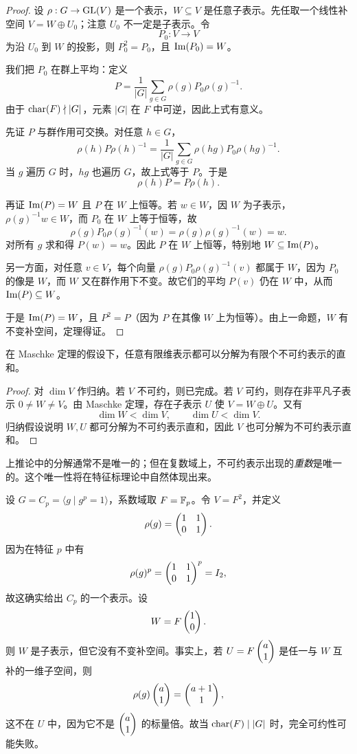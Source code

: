 \begin{proof}
设 $\rho:G\to \mathrm{GL}(V)$ 是一个表示，$W\subseteq V$ 是任意子表示。先任取一个线性补空间 $V=W\oplus U_0$；注意 $U_0$ 不一定是子表示。令
\[
P_0:V\to V
\]
为沿 $U_0$ 到 $W$ 的投影，则 $P_0^2=P_0$，且 $\mathrm{Im}(P_0)=W$。

我们把 $P_0$ 在群上平均：定义
\[
P=\frac{1}{|G|}\sum_{g\in G}\rho(g)P_0\rho(g)^{-1}.
\]
由于 $\mathrm{char}(F)\nmid |G|$，元素 $|G|$ 在 $F$ 中可逆，因此上式有意义。

先证 $P$ 与群作用可交换。对任意 $h\in G$，
\[
\rho(h)P\rho(h)^{-1}
=\frac{1}{|G|}\sum_{g\in G}\rho(hg)P_0\rho(hg)^{-1}.
\]
当 $g$ 遍历 $G$ 时，$hg$ 也遍历 $G$，故上式等于 $P$。于是
\[
\rho(h)P=P\rho(h).
\]

再证 $\mathrm{Im}(P)=W$ 且 $P$ 在 $W$ 上恒等。若 $w\in W$，因 $W$ 为子表示，$\rho(g)^{-1}w\in W$，而 $P_0$ 在 $W$ 上等于恒等，故
\[
\rho(g)P_0\rho(g)^{-1}(w)=\rho(g)\rho(g)^{-1}(w)=w.
\]
对所有 $g$ 求和得 $P(w)=w$。因此 $P$ 在 $W$ 上恒等，特别地 $W\subseteq \mathrm{Im}(P)$。

另一方面，对任意 $v\in V$，每个向量 $\rho(g)P_0\rho(g)^{-1}(v)$ 都属于 $W$，因为 $P_0$ 的像是 $W$，而 $W$ 又在群作用下不变。故它们的平均 $P(v)$ 仍在 $W$ 中，从而 $\mathrm{Im}(P)\subseteq W$。

于是 $\mathrm{Im}(P)=W$，且 $P^2=P$（因为 $P$ 在其像 $W$ 上为恒等）。由上一命题，$W$ 有不变补空间，定理得证。
\end{proof}

\begin{corollary}
在 Maschke 定理的假设下，任意有限维表示都可以分解为有限个不可约表示的直和。
\end{corollary}

\begin{proof}
对 $\dim V$ 作归纳。若 $V$ 不可约，则已完成。若 $V$ 可约，则存在非平凡子表示 $0\neq W\neq V$。由 Maschke 定理，存在子表示 $U$ 使 $V=W\oplus U$。又有
\[
\dim W<\dim V,\qquad \dim U<\dim V.
\]
归纳假设说明 $W,U$ 都可分解为不可约表示直和，因此 $V$ 也可分解为不可约表示直和。
\end{proof}

\begin{remark}
上推论中的分解通常不是唯一的；但在复数域上，不可约表示出现的\emph{重数}是唯一的。这个唯一性将在特征标理论中自然体现出来。
\end{remark}

\begin{example}
设 $G=C_p=\langle g\mid g^p=1\rangle$，系数域取 $F=\mathbb{F}_p$。令 $V=F^2$，并定义
\[
\rho(g)=\begin{pmatrix} 1&1\\0&1 \end{pmatrix}.
\]
因为在特征 $p$ 中有
\[
\rho(g)^p=\begin{pmatrix} 1&1\\0&1 \end{pmatrix}^p=I_2,
\]
故这确实给出 $C_p$ 的一个表示。设
\[
W=F\begin{pmatrix} 1\\0 \end{pmatrix}.
\]
则 $W$ 是子表示，但它没有不变补空间。事实上，若 $U=F\begin{pmatrix} a\\1 \end{pmatrix}$ 是任一与 $W$ 互补的一维子空间，则
\[
\rho(g)\begin{pmatrix} a\\1 \end{pmatrix}=\begin{pmatrix} a+1\\1 \end{pmatrix},
\]
这不在 $U$ 中，因为它不是 $\begin{pmatrix} a\\1 \end{pmatrix}$ 的标量倍。故当 $\mathrm{char}(F)\mid |G|$ 时，完全可约性可能失败。
\end{example}

